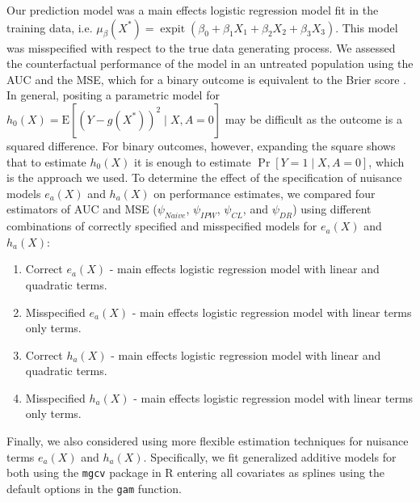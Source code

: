 Our prediction model was a main effects logistic regression model fit in the training data, i.e. $\mu_\beta\left(X^*\right) = \operatorname{expit}(\beta_0 + \beta_1 X_1 + \beta_2 X_2 + \beta_3 X_3)$. This model was misspecified with respect to the true data generating process. We assessed the counterfactual performance of the model in an untreated population using the AUC and the MSE, which for a binary outcome is equivalent to the Brier score \cite{brier_verification_1950}. In general, positing a parametric model for $h_0(X)=\mathrm{E}[(Y-g\left(X^*\right))^2 \mid X, A=0]$ may be difficult as the outcome is a squared difference. For binary outcomes, however, expanding the square shows that to estimate $h_0(X)$ it is enough to estimate $\operatorname{Pr}[Y=1 \mid X, A=0]$, which is the approach we used. To determine the effect of the specification of nuisance models $e_a(X)$ and $h_a(X)$ on performance estimates, we compared four estimators of AUC and MSE (${\psi}_{Naive}$, ${\psi}_{IPW}$, ${\psi}_{CL}$, and ${\psi}_{DR}$) using different combinations of correctly specified and misspecified models for $e_a(X)$ and $h_a(X)$:
\begin{enumerate}
    \item Correct $e_a(X)$ - main effects logistic regression model with linear and quadratic terms.
    \item Misspecified $e_a(X)$ - main effects logistic regression model with linear terms only terms.
    \item Correct $h_a(X)$ - main effects logistic regression model with linear and quadratic terms.
    \item Misspecified $h_a(X)$ - main effects logistic regression model with linear terms only terms.
\end{enumerate}
Finally, we also considered using more flexible estimation techniques for nuisance terms $e_a(X)$ and $h_a(X)$. Specifically, we fit generalized additive models for both using the \texttt{mgcv} package in $\mathrm{R}$ entering all covariates as splines using the default options in the \texttt{gam} function.

